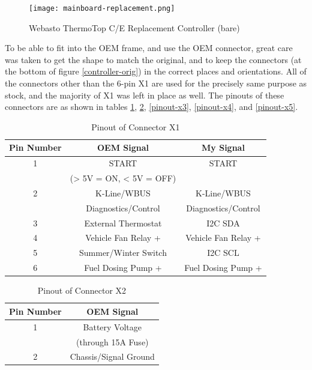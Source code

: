 \documentclass[lettersize,journal]{IEEEtran}
\begin{document}
\begin{figure}[!t]
\centering
\texttt{[image: mainboard-replacement.png]}
\caption{Webasto ThermoTop C/E Replacement Controller (bare)}
\label{controller-replacement}
\end{figure}


To be able to fit into the OEM frame, and use the OEM connector, great care was taken to get the shape to match the original, and to keep the connectors (at the bottom of figure \ref{controller-orig}) in the correct places and orientations.  All of the connectors other than the 6-pin X1 are used for the precisely same purpose as stock, and the majority of X1 was left in place as well.  The pinouts of these connectors are as shown in tables \ref{pinout-x1}, \ref{pinout-x2}, \ref{pinout-x3}, \ref{pinout-x4}, and \ref{pinout-x5}.

\begin{table}
\begin{center}
\caption{Pinout of Connector X1}
\label{pinout-x1}
\begin{tabular}{| c | c | c |}
\hline
Pin Number & OEM Signal & My Signal \\
\hline
1 & START & START \\
& (> 5V = ON, < 5V = OFF)  & \\
\hline
2 & K-Line/WBUS & K-Line/WBUS \\
&  Diagnostics/Control &  Diagnostics/Control \\
\hline
3 & External Thermostat & I2C SDA \\
\hline
4 & Vehicle Fan Relay + & Vehicle Fan Relay + \\
\hline
5 & Summer/Winter Switch & I2C SCL \\
\hline
6 & Fuel Dosing Pump + & Fuel Dosing Pump + \\
\hline
\end{tabular}
\end{center}
\end{table}

\begin{table}
\begin{center}
\caption{Pinout of Connector X2}
\label{pinout-x2}
\begin{tabular}{| c | c |}
\hline
Pin Number & OEM Signal \\
\hline
1 & Battery Voltage \\
& (through 15A Fuse) \\
\hline
2 & Chassis/Signal Ground \\
\hline
\end{tabular}
\end{center}
\end{table}
\end{document}
